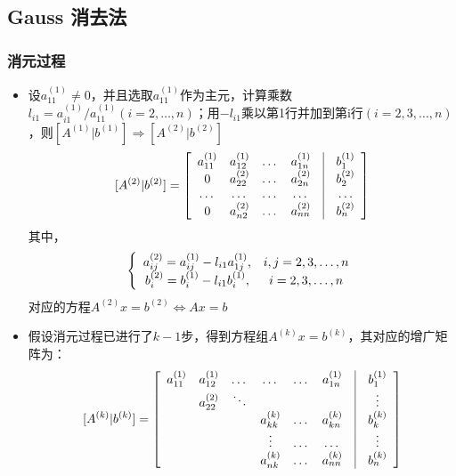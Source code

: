 \documentclass[a4paper]{article}
\begin{document}
\subsection{Gauss 消去法}
\subsubsection{消元过程}
\begin{itemize}
\item 设$a^{(1)}_{11} \neq 0$，并且选取$a^{(1)}_{11}$作为主元，计算乘数$l_{i1}=a^{(1)}_{i1} / a^{(1)}_{11} (i=2, \dots, n)$；用$-l_{i1}$乘以第1行并加到第i行$(i=2, 3, \dots, n)$，则$[A^{(1)}|b^{(1)}]\Rightarrow [A^{(2)}|b^{(2)}]$
$$[A^{(2)}|b^{(2)}]=\left[
\begin{array}{c c c c c c}
a^{(1)}_{11} & a^{(1)}_{12} & \dots & a^{(1)}_{1n} & \vline & b_1^{(1)} \\
0 & a^{(2)}_{22} & \dots & a^{(2)}_{2n} & \vline & b_2^{(2)} \\
\dots & \dots & \dots & \dots &\vline & \dots \\
0 & a^{(2)}_{n2} & \dots & a^{(2)}_{nn} &\vline & b_n^{(2)} \\ 
\end{array}\right] 
$$
其中，
$$ \left\{
\begin{array}{c c}
a^{(2)}_{ij} = a^{(1)}_{ij} - l_{i1}a^{(1)}_{1j}, &  i, j = 2, 3, \dots, n\\ 
b_i^{(2)} = b_i^{(1)} - l_{i1}b_i^{(1)}, & i=2,3, \dots, n \\
\end{array}\right.
$$
对应的方程$A^{(2)}x=b^{(2)} \Leftrightarrow Ax=b$
\item 假设消元过程已进行了$k-1$步，得到方程组$A^{(k)}x=b^{(k)}$，其对应的增广矩阵为：
\begin{equation}
\label{eqgauss}
[A^{(k)}|b^{(k)}]=\left[
\begin{array}{c c c c c c c c}
a^{(1)}_{11} & a^{(1)}_{12} & \dots & \dots &\dots &a^{(1)}_{1n} & \vline & b_1^{(1)} \\
~ & a^{(2)}_{22} & \ddots & ~ & ~ & ~ &\vline & \vdots \\
~ & ~ & ~ & a^{(k)}_{kk} & \dots & a^{(k)}_{kn} &\vline & b_k^{(k)} \\
~ & ~ & ~ & \vdots        & \dots & \dots         & \vline & \vdots \\
~ & ~ & ~ & a^{(k)}_{nk} & \dots & a^{(k)}_{nn} & \vline & b_n^{(k)} \\ 
\end{array}\right] 
\end{equation}

\end{itemize}
\end{document}
